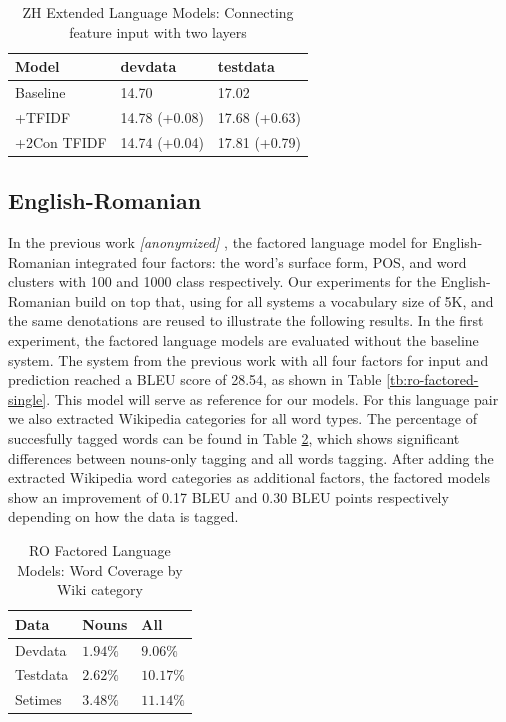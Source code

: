 \documentclass[a4paper]{article}
\newcommand{\anony}[1]{\textit{[anonymized]}}
\begin{document}
\begin{table}
\caption{ZH Extended Language Models: Connecting feature input with two layers}
\centering
  \begin{tabular}{lll}
  	\hline
  	Model       & devdata       & testdata      \\ \hline\hline
  	Baseline    & 14.70         & 17.02         \\ \hline
  	+TFIDF      & 14.78 (+0.08) & 17.68 (+0.63) \\
  	+2Con TFIDF & 14.74 (+0.04) & 17.81 (+0.79)
  \end{tabular}
  \label{tb:zh-extended-both}
\end{table}


\subsection{English-Romanian}
In the previous work \anony{\cite{niehuesusing}} , the factored language model for English-Romanian integrated four factors: the word's surface form, POS, and word clusters with 100 and 1000 class respectively. Our experiments for the English-Romanian build on top that, using for all systems a vocabulary size of 5K, and the same denotations are reused to illustrate the following results. In the first experiment, the factored language models are evaluated without the baseline system. The system from the previous work with all four factors for input and prediction reached a BLEU score of 28.54, as shown in Table \ref{tb:ro-factored-single}. This model will serve as reference for our models. For this language pair we also extracted Wikipedia categories for all word types. The percentage of succesfully tagged words can be found in Table \ref{tb:ro-word-coverage}, which shows significant differences between nouns-only tagging and all words tagging.
After adding the extracted Wikipedia word categories as additional factors, the factored models show an improvement of 0.17 BLEU and 0.30 BLEU points respectively depending on how the data is tagged.

\begin{table}
\caption{RO Factored Language Models: Word Coverage by Wiki category}
\centering
  \begin{tabular}{lll}
  	\hline
  	Data     & Nouns     & All        \\ \hline\hline
  	Devdata  & $1.94 \%$ & $9.06 \%$  \\
  	Testdata & $2.62 \%$ & $10.17 \%$ \\ \hline
  	Setimes  & $3.48 \%$ & $11.14 \%$
  \end{tabular}
  \label{tb:ro-word-coverage}
\end{table}
\end{document}
